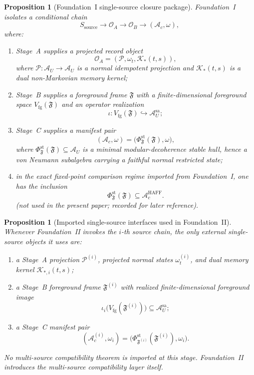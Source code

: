 \documentclass[12pt]{article}
\newtheorem{proposition}[theorem]{Proposition}
\theoremstyle{definition}
\theoremstyle{remark}
\begin{document}
\begin{proposition}[Foundation~I single-source closure package]
\label{prop:appF1}
Foundation~I~\cite{FoundationI} isolates a conditional chain
\[
S_{\mathrm{source}}
\to
\mathcal O_A
\to
\mathcal O_B
\to
(\mathcal A_c,\omega),
\]
where:
\begin{enumerate}
\item Stage~A supplies a projected record object
  \[
  \mathcal O_A=(\mathcal P,\omega_t,\mathcal K_*(t,s)),
  \]
  where \(\mathcal P:\mathcal A_U\to\mathcal A_U\) is a normal
  idempotent projection and \(\mathcal K_*(t,s)\) is a dual
  non-Markovian memory kernel;
\item Stage~B supplies a foreground frame \(\mathfrak F\) with a
  finite-dimensional foreground space
  \(V_{\mathrm{fg}}(\mathfrak F)\) and an operator realization
  \[
  \iota:V_{\mathrm{fg}}(\mathfrak F)\hookrightarrow \mathcal A_U^{\mathrm{sa}};
  \]
\item Stage~C supplies a manifest pair
  \[
  (\mathcal A_c,\omega)
  =
  \bigl(\Phi_{\mathfrak F}^{\mathrm{st}}(\mathfrak F),\omega\bigr),
  \]
  where \(\Phi_{\mathfrak F}^{\mathrm{st}}(\mathfrak F)\subseteq
  \mathcal A_U\) is a minimal modular-decoherence stable hull, hence a
  von Neumann subalgebra carrying a faithful normal restricted state;
\item in the exact fixed-point comparison regime imported from
  Foundation~I, one has the inclusion
  \[
  \Phi_{\mathfrak F}^{\mathrm{st}}(\mathfrak F)
  \subseteq
  \mathcal A_c^{\mathrm{HAFF}}.
  \]
  (not used in the present paper; recorded for later reference).
\end{enumerate}
\end{proposition}

\begin{proposition}[Imported single-source interfaces used in Foundation~II]
\label{prop:appinterfaces}
Whenever Foundation~II invokes the \(i\)-th source chain, the only
external single-source objects it uses are:
\begin{enumerate}
\item a Stage~A projection
  \(\mathcal P^{(i)}\), projected normal states
  \(\omega_t^{(i)}\), and dual memory kernel
  \(\mathcal K_{*,i}(t,s)\);
\item a Stage~B foreground frame \(\mathfrak F^{(i)}\) with realized
  finite-dimensional foreground image
  \[
  \iota_i\bigl(V_{\mathrm{fg}}(\mathfrak F^{(i)})\bigr)
  \subseteq
  \mathcal A_U^{\mathrm{sa}};
  \]
\item a Stage~C manifest pair
  \[
  (\mathcal A_c^{(i)},\omega_i)
  =
  \bigl(\Phi_{\mathfrak F^{(i)}}^{\mathrm{st}}(\mathfrak F^{(i)}),
  \omega_i\bigr).
  \]
\end{enumerate}
No multi-source compatibility theorem is imported at this stage.
Foundation~II introduces the multi-source compatibility layer itself.
\end{proposition}
\end{document}
